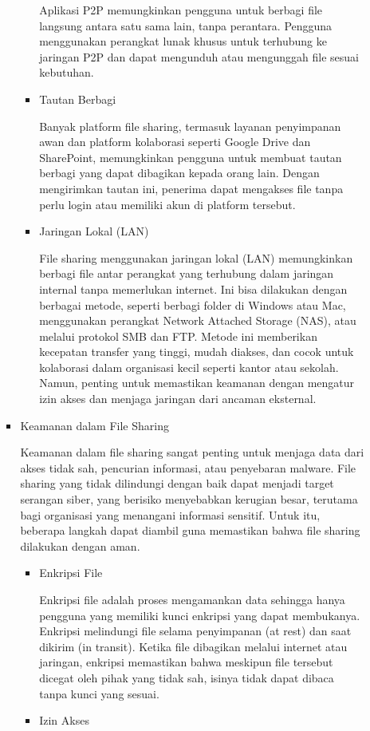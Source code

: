 \documentclass[12pt]{article}
\begin{document}
\begin{itemize}
\begin{enumerate}
\begin{itemize}
\begin{itemize}
                Aplikasi P2P memungkinkan pengguna untuk berbagi file langsung antara satu sama lain, tanpa perantara. Pengguna menggunakan perangkat lunak khusus untuk terhubung ke jaringan P2P dan dapat mengunduh atau mengunggah file sesuai kebutuhan.
                
                \item Tautan Berbagi

                Banyak platform file sharing, termasuk layanan penyimpanan awan dan platform kolaborasi seperti Google Drive dan SharePoint, memungkinkan pengguna untuk membuat tautan berbagi yang dapat dibagikan kepada orang lain. Dengan mengirimkan tautan ini, penerima dapat mengakses file tanpa perlu login atau memiliki akun di platform tersebut.
                \item Jaringan Lokal (LAN)

                File sharing menggunakan jaringan lokal (LAN) memungkinkan berbagi file antar perangkat yang terhubung dalam jaringan internal tanpa memerlukan internet. Ini bisa dilakukan dengan berbagai metode, seperti berbagi folder di Windows atau Mac, menggunakan perangkat Network Attached Storage (NAS), atau melalui protokol SMB dan FTP. Metode ini memberikan kecepatan transfer yang tinggi, mudah diakses, dan cocok untuk kolaborasi dalam organisasi kecil seperti kantor atau sekolah. Namun, penting untuk memastikan keamanan dengan mengatur izin akses dan menjaga jaringan dari ancaman eksternal.
            \end{itemize}
            \item Keamanan dalam File Sharing

            Keamanan dalam file sharing sangat penting untuk menjaga data dari akses tidak sah, pencurian informasi, atau penyebaran malware. File sharing yang tidak dilindungi dengan baik dapat menjadi target serangan siber, yang berisiko menyebabkan kerugian besar, terutama bagi organisasi yang menangani informasi sensitif. Untuk itu, beberapa langkah dapat diambil guna memastikan bahwa file sharing dilakukan dengan aman.
            \begin{itemize}
                \item Enkripsi File

                Enkripsi file adalah proses mengamankan data sehingga hanya pengguna yang memiliki kunci enkripsi yang dapat membukanya. Enkripsi melindungi file selama penyimpanan (at rest) dan saat dikirim (in transit). Ketika file dibagikan melalui internet atau jaringan, enkripsi memastikan bahwa meskipun file tersebut dicegat oleh pihak yang tidak sah, isinya tidak dapat dibaca tanpa kunci yang sesuai.
                \item Izin Akses


\end{itemize}
\end{itemize}
\end{enumerate}
\end{itemize}
\end{document}
